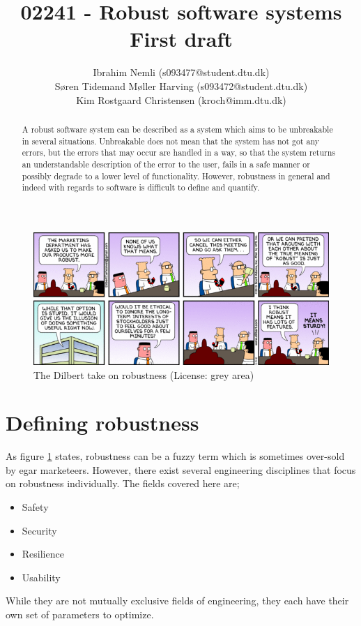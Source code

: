 \documentclass[10pt,a4paper]{article}
\begin{document}
\author{
  Ibrahim Nemli (s093477@student.dtu.dk)\\
  Søren Tidemand Møller Harving (s093472@student.dtu.dk) \\
  Kim Rostgaard Christensen (kroch@imm.dtu.dk)
}
\title{02241 - Robust software systems \\
	First draft
}

\maketitle

\begin{abstract}
A robust software system can be described as a system which aims to be unbreakable in several situations. Unbreakable does not mean that the system has not got any errors, but the errors that may occur are handled in a way, so that the system returns an understandable description of the error to the user, fails in a safe manner or possibly degrade to a lower level of functionality. However, robustness in general and indeed with regards to software is difficult to define and quantify.
\end{abstract}

\tableofcontents
\newpage
\begin{figure}[h]
\centering
\includegraphics[scale=0.4]{fig/dilbert_robust.png}
 \caption{The Dilbert take on robustness (License: grey area)}
 \label{fig:dilber_robustness}
\end{figure}


\section{Defining robustness}
As figure \ref{fig:dilber_robustness} states, robustness can be a fuzzy term which is sometimes over-sold by egar marketeers.
However, there exist several engineering disciplines that focus on robustness individually. The fields covered here are;
\begin{itemize}
\item Safety
\item Security
\item Resilience
\item Usability
\end{itemize}
While they are not mutually exclusive fields of engineering, they each have their own set of parameters to optimize.
\end{document}
